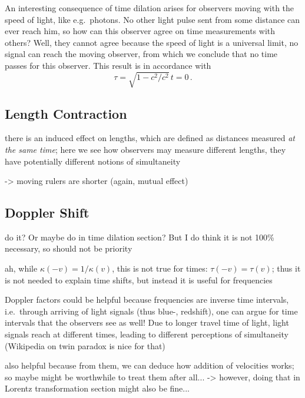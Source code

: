 An interesting consequence of time dilation arises for observers moving with the speed of light, like e.g.~photons. No other light pulse sent from some distance can ever reach him, so how can this observer agree on time measurements with others? Well, they cannot agree because the speed of light is a universal limit, no signal can reach the moving observer, from which we conclude that no time passes for this observer. This result is in accordance with
\begin{equation}
	\tau = \sqrt{1 - c^2 / c^2} \, t = 0 \, .
\end{equation}



		\subsection{Length Contraction}
there is an induced effect on lengths, which are defined as distances measured \emph{at the same time}; here we see how observers may measure different lengths, they have potentially different notions of simultaneity

-> moving rulers are shorter (again, mutual effect)



		\subsection{Doppler Shift}
do it? Or maybe do in time dilation section? But I do think it is not 100\% necessary, so should not be priority


ah, while $\kappa(-v) = 1 / \kappa(v)$, this is not true for times: $\tau(-v) = \tau(v)$; thus it is not needed to explain time shifts, but instead it is useful for frequencies


Doppler factors could be helpful because frequencies are inverse time intervals, i.e.~through arriving of light signals (thus blue-, redshift), one can argue for time intervals that the observers see as well! Due to longer travel time of light, light signals reach at different times, leading to different perceptions of simultaneity (Wikipedia on twin paradox is nice for that)


also helpful because from them, we can deduce how addition of velocities works; so maybe might be worthwhile to treat them after all... -> however, doing that in Lorentz transformation section might also be fine...



\newpage



